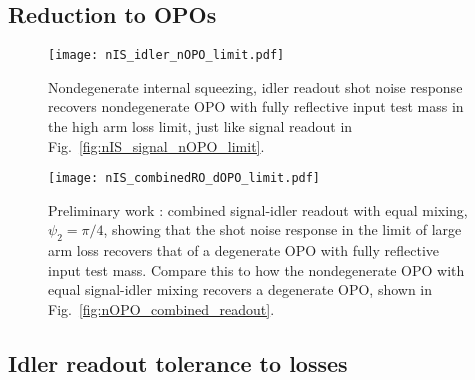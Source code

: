 

\subsection{Reduction to OPOs}


\begin{figure}
	\centering
	\texttt{[image: nIS\_idler\_nOPO\_limit.pdf]}
	\caption{  Nondegenerate internal squeezing, idler readout shot noise response recovers nondegenerate OPO with fully reflective input test mass in the high arm loss limit, just like signal readout in Fig.~\ref{fig:nIS_signal_nOPO_limit}.}
	\label{fig:}
\end{figure}

\begin{figure}
	\centering
	\texttt{[image: nIS\_combinedRO\_dOPO\_limit.pdf]}
	\caption{  Preliminary work : combined signal-idler readout with equal mixing, $\psi_2=\pi/4$, showing that the shot noise response in the limit of large arm loss recovers that of a degenerate OPO with fully reflective input test mass. Compare this to how the nondegenerate OPO with equal signal-idler mixing recovers a degenerate OPO, shown in Fig.~\ref{fig:nOPO_combined_readout}.}
	\label{fig:}
\end{figure}


\subsection{Idler readout tolerance to losses}


